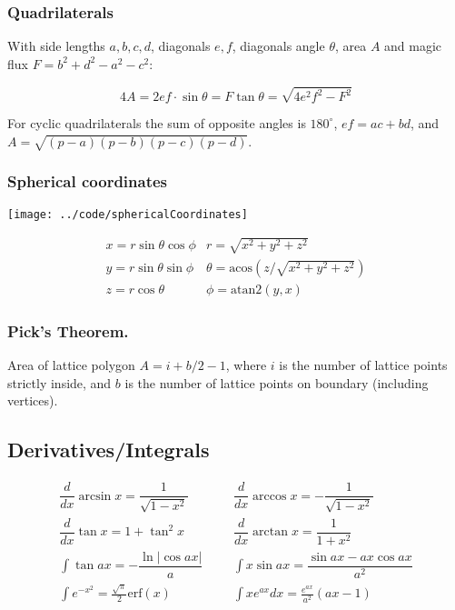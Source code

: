 \begin{small}
\subsubsection{Quadrilaterals}
With side lengths $a,b,c,d$, diagonals $e, f$, diagonals angle $\theta$, area $A$ and
magic flux $F=b^2+d^2-a^2-c^2$:

\[ 4A = 2ef \cdot \sin\theta = F\tan\theta = \sqrt{4e^2f^2-F^2} \]

 For cyclic quadrilaterals the sum of opposite angles is $180^\circ$,
$ef = ac + bd$, and $A = \sqrt{(p-a)(p-b)(p-c)(p-d)}$.

\subsubsection{Spherical coordinates}
\centerline{\texttt{[image: ../code/sphericalCoordinates]}}
\[\begin{array}{cc}
x = r\sin\theta\cos\phi & r = \sqrt{x^2+y^2+z^2}\\
y = r\sin\theta\sin\phi & \theta = \textrm{acos}(z/\sqrt{x^2+y^2+z^2})\\
z = r\cos\theta & \phi = \textrm{atan2}(y,x)
\end{array}\]

\subsubsection{Pick's Theorem.} Area of lattice polygon $A = i + b/2 - 1$, where $i$ is the number of lattice points strictly inside, and $b$ is the number of lattice points on boundary (including vertices).

\subsection{Derivatives/Integrals}
\begin{align*}
  \dfrac{d}{dx}\arcsin x = \dfrac{1}{\sqrt{1-x^2}} &&& \dfrac{d}{dx}\arccos x = -\dfrac{1}{\sqrt{1-x^2}} \\
  \dfrac{d}{dx}\tan x = 1+\tan^2 x &&& \dfrac{d}{dx}\arctan x = \dfrac{1}{1+x^2} \\
  \int\tan ax = -\dfrac{\ln|\cos ax|}{a} &&& \int x\sin ax = \dfrac{\sin ax-ax \cos ax}{a^2} \\
  \int e^{-x^2} = \frac{\sqrt \pi}{2} \text{erf}(x) &&& \int xe^{ax}dx = \frac{e^{ax}}{a^2}(ax-1)
\end{align*}


\end{small}
